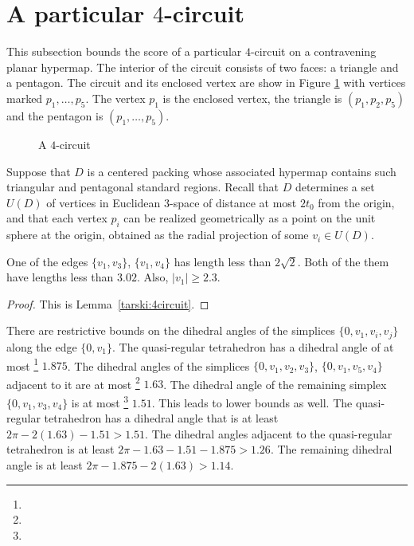 \section{A particular $4$-circuit} %

This subsection bounds the score of a particular $4$-circuit on a
contravening planar hypermap.  The interior of the circuit
consists of two faces: a triangle and a pentagon.  The circuit and
its enclosed vertex are show in Figure \ref{fig:no4circuit} with
vertices marked $p_1,\ldots,p_5$.  The vertex $p_1$ is the
enclosed vertex, the triangle is $(p_1,p_2,p_5)$ and the pentagon
is $(p_1,\ldots,p_5)$.

\begin{figure}[htb]
  \centering
  \caption{A $4$-circuit}
  \label{fig:no4circuit}
\end{figure}

Suppose that $D$ is a centered packing whose associated hypermap
contains such triangular and pentagonal standard regions. Recall
that $D$ determines a set $U(D)$ of vertices in Euclidean
$3$-space of distance at most $2t_0$ from the origin, and that
each vertex $p_i$ can be realized geometrically as a point on the
unit sphere at the origin, obtained as the radial projection of
some $v_i\in U(D)$.

\begin{lemma}  One of the edges $\{v_1,v_3\}$, $\{v_1,v_4\}$ has
length less than $2\sqrt{2}$.  Both of the them have lengths less
than $3.02$. Also, $|v_1|\ge2.3$.
\end{lemma}

\begin{proof} This is Lemma~\ref{tarski:4circuit}.
\end{proof}


There are restrictive bounds on the dihedral angles of the
simplices $\{0,v_1,v_i,v_j\}$ along the edge $\{0,v_1\}$. The
quasi-regular tetrahedron has a dihedral angle of at most%
\footnote{} $1.875$.  The dihedral angles of the
simplices $\{0,v_1,v_2,v_3\}$, $\{0,v_1,v_5,v_4\}$
adjacent to it are at most%
\footnote{}  $1.63$. The dihedral angle of the
remaining simplex $\{0,v_1,v_3,v_4\}$ is at most%
\footnote{} $1.51$.   This leads to lower bounds
as well. The quasi-regular tetrahedron has a dihedral angle that
is at least $2\pi - 2(1.63)-1.51 > 1.51$.  The dihedral angles
adjacent to the quasi-regular tetrahedron is at least $2\pi-
1.63-1.51-1.875> 1.26$. The remaining dihedral angle is at least
$2\pi-1.875-2(1.63) > 1.14$.

